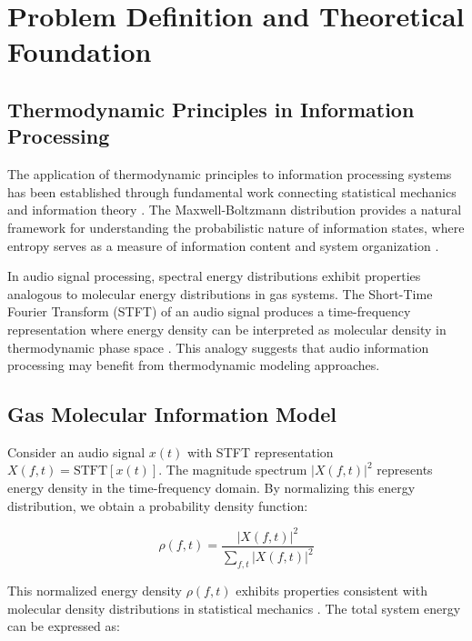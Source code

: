 \section{Problem Definition and Theoretical Foundation}

\subsection{Thermodynamic Principles in Information Processing}

The application of thermodynamic principles to information processing systems has been established through fundamental work connecting statistical mechanics and information theory \cite{shannon1948, jaynes1957, landauer1961}. The Maxwell-Boltzmann distribution provides a natural framework for understanding the probabilistic nature of information states, where entropy serves as a measure of information content and system organization \cite{cover2006}.

In audio signal processing, spectral energy distributions exhibit properties analogous to molecular energy distributions in gas systems. The Short-Time Fourier Transform (STFT) of an audio signal produces a time-frequency representation where energy density can be interpreted as molecular density in thermodynamic phase space \cite{cohen1995}. This analogy suggests that audio information processing may benefit from thermodynamic modeling approaches.


\subsection{Gas Molecular Information Model}

Consider an audio signal $x(t)$ with STFT representation $X(f,t) = \text{STFT}[x(t)]$. The magnitude spectrum $|X(f,t)|^2$ represents energy density in the time-frequency domain. By normalizing this energy distribution, we obtain a probability density function:

\begin{equation}
\rho(f,t) = \frac{|X(f,t)|^2}{\sum_{f,t} |X(f,t)|^2}
\end{equation}

This normalized energy density $\rho(f,t)$ exhibits properties consistent with molecular density distributions in statistical mechanics \cite{reif1965}. The total system energy can be expressed as:

